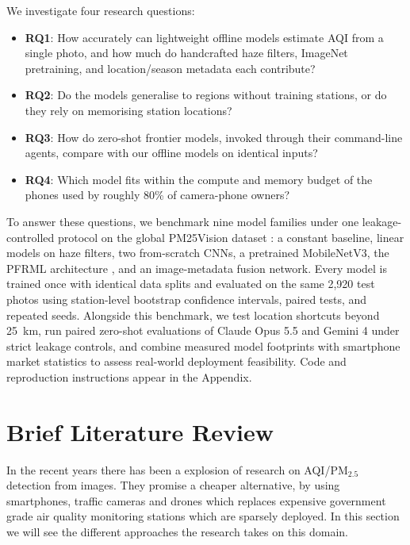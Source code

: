 \documentclass[conference]{IEEEtran}
\newcommand{\pmtwofive}{PM$_{2.5}$}
\begin{document}
We investigate four research questions:
\begin{itemize}
  \item \textbf{RQ1}: How accurately can lightweight offline models estimate AQI
        from a single photo, and how much do handcrafted haze filters, ImageNet
        pretraining, and location/season metadata each contribute?
  \item \textbf{RQ2}: Do the models generalise to regions without training
        stations, or do they rely on memorising station locations?
  \item \textbf{RQ3}: How do zero-shot frontier models, invoked through their
        command-line agents, compare with our offline models on identical
        inputs?
  \item \textbf{RQ4}: Which model fits within the compute and memory budget of
        the phones used by roughly 80\% of camera-phone owners?
\end{itemize}

To answer these questions, we benchmark nine model families under one
leakage-controlled protocol on the global PM25Vision dataset
\cite{pm25vision2025}: a constant baseline, linear models on haze filters, two
from-scratch CNNs, a pretrained MobileNetV3, the PFRML architecture
\cite{wangPrototypeFeatureRepresentationGuided2026}, and an image-metadata
fusion network. Every model is trained once with identical data splits and
evaluated on the same 2,920 test photos using station-level bootstrap confidence
intervals, paired tests, and repeated seeds. Alongside this benchmark, we test
location shortcuts beyond 25~km, run paired zero-shot evaluations of Claude Opus
5.5 and Gemini 4 under strict leakage controls, and combine measured model
footprints with smartphone market statistics to assess real-world deployment
feasibility. Code and reproduction instructions appear in the Appendix.

\section{Brief Literature Review}

In the recent years there has been a explosion of research on AQI/\pmtwofive{}
detection from images. They promise a cheaper alternative, by using smartphones,
traffic cameras and drones which replaces expensive government grade air quality
monitoring stations which are sparsely deployed. In this section we will see the
different approaches the research takes on this domain.
\end{document}

